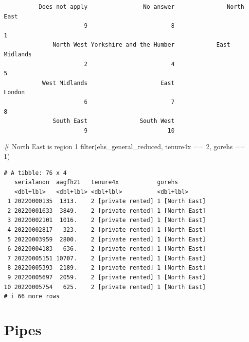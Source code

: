 \documentclass[
  letterpaper,
  DIV=11,
  numbers=noendperiod]{scrreprt}
\newenvironment{Shaded}{\begin{snugshade}}{\end{snugshade}}
\newcommand{\CommentTok}[1]{\textcolor[rgb]{0.37,0.37,0.37}{#1}}
\newcommand{\DecValTok}[1]{\textcolor[rgb]{0.68,0.00,0.00}{#1}}
\newcommand{\FunctionTok}[1]{\textcolor[rgb]{0.28,0.35,0.67}{#1}}
\newcommand{\NormalTok}[1]{\textcolor[rgb]{0.00,0.23,0.31}{#1}}
\newcommand{\SpecialCharTok}[1]{\textcolor[rgb]{0.37,0.37,0.37}{#1}}
\begin{document}
\begin{Shaded}
\end{Shaded}

\begin{verbatim}
          Does not apply                No answer               North East 
                      -9                       -8                        1 
              North West Yorkshire and the Humber            East Midlands 
                       2                        4                        5 
           West Midlands                     East                   London 
                       6                        7                        8 
              South East               South West 
                       9                       10 
\end{verbatim}

\begin{Shaded}
\begin{Highlighting}[]
\CommentTok{\# North East is region 1}
\FunctionTok{filter}\NormalTok{(ehs\_general\_reduced, tenure4x }\SpecialCharTok{==} \DecValTok{2}\NormalTok{, gorehs }\SpecialCharTok{==} \DecValTok{1}\NormalTok{)}
\end{Highlighting}
\end{Shaded}

\begin{verbatim}
# A tibble: 76 x 4
   serialanon  aagfh21   tenure4x           gorehs        
   <dbl+lbl>   <dbl+lbl> <dbl+lbl>          <dbl+lbl>     
 1 20220000135  1313.    2 [private rented] 1 [North East]
 2 20220001633  3849.    2 [private rented] 1 [North East]
 3 20220002101  1016.    2 [private rented] 1 [North East]
 4 20220002817   323.    2 [private rented] 1 [North East]
 5 20220003959  2800.    2 [private rented] 1 [North East]
 6 20220004183   636.    2 [private rented] 1 [North East]
 7 20220005151 10707.    2 [private rented] 1 [North East]
 8 20220005393  2189.    2 [private rented] 1 [North East]
 9 20220005697  2059.    2 [private rented] 1 [North East]
10 20220005754   625.    2 [private rented] 1 [North East]
# i 66 more rows
\end{verbatim}

\section{Pipes}\label{pipes}
\end{document}
